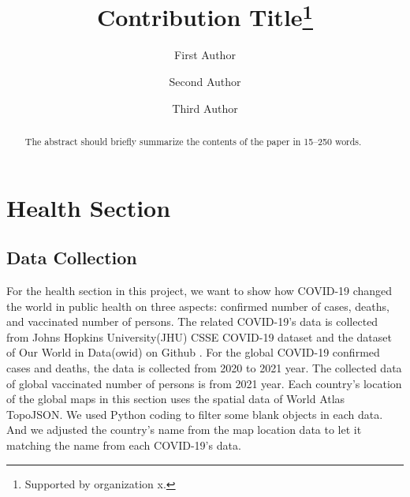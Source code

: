\documentclass[runningheads]{llncs}
\begin{document}
%
\title{Contribution Title\thanks{Supported by organization x.}}
%
%
\author{First Author \and
Second Author \and
Third Author}
%
%
%
\maketitle              %
%
\begin{abstract}
The abstract should briefly summarize the contents of the paper in
15--250 words.

\end{abstract}
%
%
%
\section{Health Section}
\subsection{Data Collection}
For the health section in this project, we want to show how COVID-19 changed the world in public health on three aspects: confirmed number of cases, deaths, and vaccinated number of persons. 
The related COVID-19’s data is collected from Johns Hopkins University(JHU) CSSE COVID-19 dataset \cite{JHU_url} and the dataset of Our World in Data(owid) on Github \cite{owid_url}. 
For the global COVID-19 confirmed cases and deaths, the data is collected from 2020 to 2021 year. The collected data of global vaccinated number of persons is from 2021 year.
Each country's location of the global maps in this section uses the spatial data of World Atlas TopoJSON. We used Python coding to filter some blank objects in each data.
And we adjusted the country's name from the map location data to let it matching the name from each COVID-19’s data.
\end{document}
